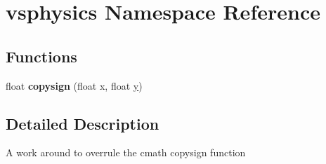 \hypertarget{namespacevsphysics}{}\section{vsphysics Namespace Reference}
\label{namespacevsphysics}
\subsection*{Functions}
\begin{DoxyCompactItemize}
\item 
float {\bfseries copysign} (float x, float \hyperlink{IceUtils_8h_aa7ffaed69623192258fb8679569ff9ba}{y})\hypertarget{namespacevsphysics_a4d7b86cf1b3209bfcc793c76785313a1}{}\label{namespacevsphysics_a4d7b86cf1b3209bfcc793c76785313a1}

\end{DoxyCompactItemize}


\subsection{Detailed Description}
A work around to overrule the cmath copysign function 